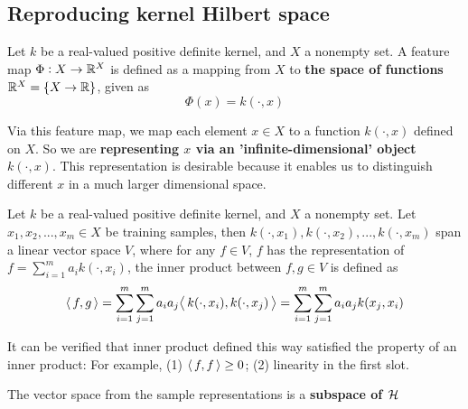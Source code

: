 \begin{refsection}
\subsection{Reproducing kernel Hilbert space}

\begin{definition}
	\cite[32]{scholkopf2002learning}Let $k$ be a real-valued positive definite kernel, and $X$ a nonempty set. A feature map $\Phi: X\to \mathbb{R}^X$ is defined as a mapping from $X$ to \textbf{the space of functions }$\mathbb{R}^X = \{X\to \mathbb{R}\}$, given as
	$$\Phi(x) = k(\cdot,x)$$
\end{definition}


\begin{remark}
	Via this feature map, we map each element $x\in X$ to a function $k(\cdot,x)$ defined on $X$. So we are \textbf{representing $x$ via an 'infinite-dimensional' object $k(\cdot,x)$}. This representation is desirable because it enables us to distinguish different $x$ in a much larger dimensional space.
\end{remark}


\begin{definition}
	Let $k$ be a real-valued positive definite kernel, and $X$ a nonempty set. Let $x_1,x_2,...,x_m \in X$ be training samples, then $k(\cdot,x_1),k(\cdot,x_2),...,k(\cdot,x_m)$ span a linear vector space $V$, where for any $f\in V$, $f$ has the representation of $f = \sum_{i=1}^m a_i k(\cdot,x_i)$, the inner product between $f,g\in V$ is defined as
	$${\left< \, f,g \, \right>} = \sum_{i=1}^m\sum_{j=1}^m a_ia_j {\left< \, k(\cdot,x_i),k(\cdot,x_j) \, \right>} = \sum_{i=1}^m\sum_{j=1}^m a_ia_j k(x_j,x_i)$$
\end{definition}

\begin{remark}
	It can be verified that inner product defined this way satisfied the property of an inner product: For example, (1) ${\left< \, f,f \, \right>} \geq 0$; (2) linearity in the first slot. 
\end{remark}

\begin{remark}
	The vector space from the sample representations is a \textbf{subspace of $\mathcal{H}$}
\end{remark}



\end{refsection}
